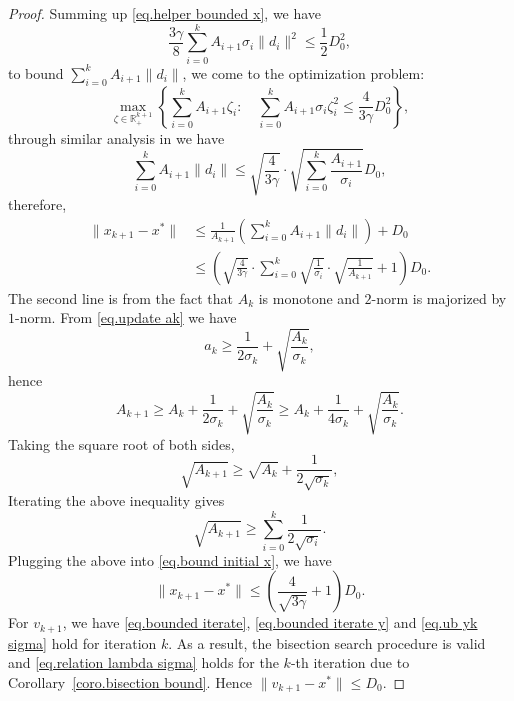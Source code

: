 \documentclass{mcom-l}
\numberwithin{equation}{section}
\begin{document}
\begin{proof}
    Summing up \eqref{eq.helper bounded x}, we have
    \begin{equation*}
        \frac{3\gamma}{8}\sum_{i=0}^k A_{i+1}\sigma_i \|d_i\|^2 \leq \frac{1}{2}D_0^2,
    \end{equation*}
    to bound $\sum_{i=0}^k A_{i+1}\|d_i\|$, we come to the optimization problem:
    \begin{equation*}
        \max _{\zeta \in \mathbb{R}^{k+1}_+}\left\{\sum_{i=0}^{k} A_{i+1}\zeta_i: \quad \sum_{i=0}^{k} A_{i+1} \sigma_i\zeta_i^2 \leq \frac{4}{3\gamma}D_0^2\right\},
    \end{equation*}
    through similar analysis in \citet[Lemma A.2]{monteiro2013accelerated} we have
    \begin{equation*}
        \sum_{i=0}^k A_{i+1}\|d_i\| \leq \sqrt{\frac{4}{3\gamma}}\cdot \sqrt{\sum_{i=0}^k \frac{A_{i+1}}{\sigma_i}} D_0,
    \end{equation*}
    therefore,
    \begin{equation}\label{eq.bound initial x}
        \begin{aligned}
            \|x_{k+1}-x^*\| & \leq \frac{1}{A_{k+1}}\left (\sum_{i=0}^k A_{i+1}\|d_i\|\right)+D_0                                                        \\
                            & \leq \left(\sqrt{\frac{4}{3\gamma}}\cdot \sum_{i=0}^k\sqrt{\frac{1}{\sigma_i}}\cdot \sqrt{\frac{1}{A_{k+1}}} +1\right)D_0.
        \end{aligned}
    \end{equation}
    The second line is from the fact that $A_k$ is monotone and $2$-norm is majorized by $1$-norm. From \eqref{eq.update ak} we have
    \begin{equation*}
        a_k \geq \frac{1}{2\sigma_k}+\sqrt{\frac{A_k}{\sigma_k}},
    \end{equation*}
    hence
    \begin{equation*}
        A_{k+1}\geq A_k+\frac{1}{2\sigma_k}+\sqrt{\frac{A_k}{\sigma_k}}\geq A_k+\frac{1}{4\sigma_k}+\sqrt{\frac{A_k}{\sigma_k}}.
    \end{equation*}
    Taking the square root of both sides,
    \begin{equation*}
        \sqrt{A_{k+1}}\geq \sqrt{A_k}+\frac{1}{2\sqrt{\sigma_k}},
    \end{equation*}
    Iterating the above inequality gives
    \begin{equation*}
        \sqrt{A_{k+1}}\geq \sum_{i=0}^k \frac{1}{2\sqrt{\sigma_i}}.
    \end{equation*}
    Plugging the above into \eqref{eq.bound initial x}, we have
    \begin{equation*}
        \|x_{k+1}-x^*\| \leq \left( \frac{4}{\sqrt{3\gamma}}+1\right) D_0.
    \end{equation*}
    For $v_{k+1}$, we have \eqref{eq.bounded iterate}, \eqref{eq.bounded iterate y} and \eqref{eq.ub yk sigma} hold for iteration $k$. As a result, the bisection search procedure is valid and \eqref{eq.relation lambda sigma} holds for the $k$-th iteration due to Corollary~\ref{coro.bisection bound}. Hence $\|v_{k+1}-x^*\|\leq D_0$.


\end{proof}
\end{document}
